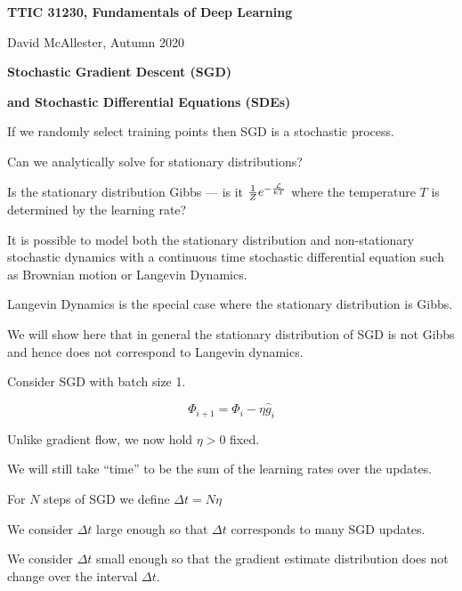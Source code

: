 




{\Huge
  \centerline{\bf TTIC 31230, Fundamentals of Deep Learning}
  \bigskip
  \centerline{David McAllester, Autumn 2020}
  \vfill
  \centerline{\bf Stochastic Gradient Descent (SGD)}
  \vfill
  \centerline{\bf and Stochastic Differential Equations (SDEs)}
  \vfill
  \vfill
  \vfill


If we randomly select training points then SGD is a stochastic process.

\vfill
Can we analytically solve for stationary distributions?

\vfill
Is the stationary distribution Gibbs --- is it $\frac{1}{Z}e^{-\frac{{\cal L}}{kT}}$ where the temperature $T$ is determined by the learning rate?



It is possible to model both the stationary distribution and non-stationary stochastic dynamics
with a {\color{red} continuous time} stochastic differential equation such as {\color{red} Brownian motion}
or {\color{red} Langevin Dynamics}.

\vfill
Langevin Dynamics is the special case where the stationary distribution is Gibbs.

\vfill
We will show here that in general the stationary distribution of SGD is not Gibbs and hence does not correspond to Langevin dynamics.



\vfill
Consider SGD with batch size 1.

$$\Phi_{i+1} = \Phi_i - \eta\hat{g}_i$$

\vfill
Unlike gradient flow, we now hold $\eta > 0$ fixed.

\vfill
We will still take ``time'' to be the sum of the learning rates over the updates.

\vfill
For $N$ steps of SGD we define $\Delta t = N \eta$


We consider $\Delta t$ large enough so that $\Delta t$ corresponds to many SGD updates.

\vfill
We consider $\Delta t$ small enough so that the gradient estimate distribution does not change over the interval $\Delta t$.


}
